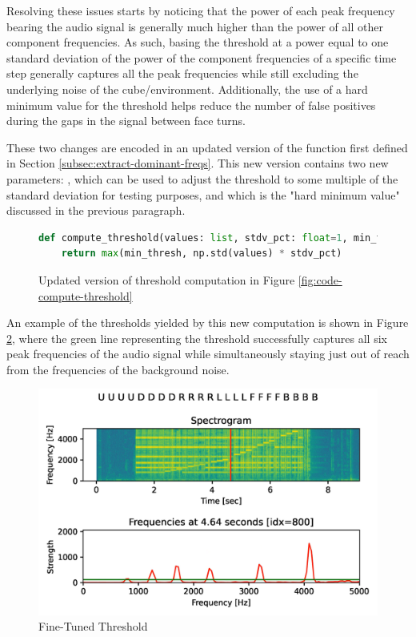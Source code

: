 \newpage
Resolving these issues starts by noticing that the power of each peak frequency bearing the audio signal is generally much higher than the power of all other component frequencies.
As such, basing the threshold at a power equal to one standard deviation of the power of the component frequencies of a specific time step generally captures all the peak frequencies while still excluding the underlying noise of the cube/environment.
Additionally, the use of a hard minimum value for the threshold helps reduce the number of false positives during the gaps in the signal between face turns.

These two changes are encoded in an updated version of the  function first defined in Section \ref{subsec:extract-dominant-freqs}.
This new version contains two new parameters: , which can be used to adjust the threshold to some multiple of the standard deviation for testing purposes, and  which is the "hard minimum value" discussed in the previous paragraph.

\begin{figure}[h]
\caption{Updated version of threshold computation in Figure \ref{fig:code-compute-threshold}}
\label{fig:code-compute-threshold-v2}
\begin{lstlisting}[language=Python]
def compute_threshold(values: list, stdv_pct: float=1, min_thresh: int=50):
    return max(min_thresh, np.std(values) * stdv_pct)
\end{lstlisting}
\end{figure}

An example of the thresholds yielded by this new computation is shown in Figure \ref{fig:threshold-refined}, where the green line representing the threshold successfully captures all six peak frequencies of the audio signal while simultaneously staying just out of reach from the frequencies of the background noise.

\begin{figure}[h]
    \centering
    \caption{Fine-Tuned Threshold}
    \label{fig:threshold-refined}
    \includegraphics[width=0.8\linewidth]{Figures/5 Algorithm Design/threshold-refined.png}
\end{figure}

